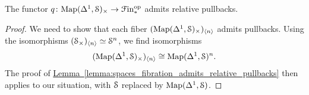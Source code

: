 \documentclass[main.tex]{subfiles}
\begin{document}
\begin{lemma}
  The functor $q\colon \Map(\Delta^{1}, \S)_{\times} \to \Finp\op$ admits relative pullbacks.
\end{lemma}
\begin{proof}
  We need to show that each fiber $(\Map(\Delta^{1}, \S)_{\times})_{\langle n \rangle}$ admits pullbacks. Using the isomorphisms $(\S_{\times})_{\langle n \rangle} \simeq \S^{n}$, we find isomorphisms
  \begin{equation*}
    (\Map(\Delta^{1}, \S)_{\times})_{\langle n \rangle} \cong \Map(\Delta^{1}, \S)^{n}.
  \end{equation*}
  The proof of \hyperref[lemma:spaces_fibration_admits_relative_pullbacks]{Lemma~\ref*{lemma:spaces_fibration_admits_relative_pullbacks}} then applies to our situation, with $\S$ replaced by $\Map(\Delta^{1}, \S)$.
\end{proof}
\end{document}

